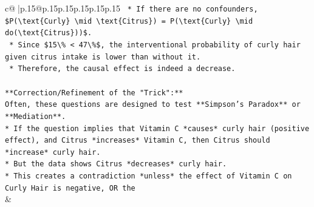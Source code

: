 \documentclass{article}
\begin{document}
{\begin{supertabular}{c@{$\;$}|p{.15\linewidth}@{}p{.15\linewidth}p{.15\linewidth}p{.15\linewidth}p{.15\linewidth}p{.15\linewidth}}
{{{\texttt{    *   If there are no confounders, \$P(\textbackslash{}text\{Curly\} \textbackslash{}mid \textbackslash{}text\{Citrus\}) = P(\textbackslash{}text\{Curly\} \textbackslash{}mid do(\textbackslash{}text\{Citrus\}))\$.} \\
\texttt{    *   Since \$15\textbackslash{}\% < 47\textbackslash{}\%\$, the interventional probability of curly hair given citrus intake is lower than without it.} \\
\texttt{    *   Therefore, the causal effect is indeed a decrease.} \\
\\ 
\texttt{**Correction/Refinement of the "Trick":**} \\
\texttt{Often, these questions are designed to test **Simpson's Paradox** or **Mediation**.} \\
\texttt{*   If the question implies that Vitamin C *causes* curly hair (positive effect), and Citrus *increases* Vitamin C, then Citrus should *increase* curly hair.} \\
\texttt{*   But the data shows Citrus *decreases* curly hair.} \\
\texttt{*   This creates a contradiction *unless* the effect of Vitamin C on Curly Hair is negative, OR the} \\
            }
        }
    }
    & \\ \\


\end{supertabular}}
\end{document}
